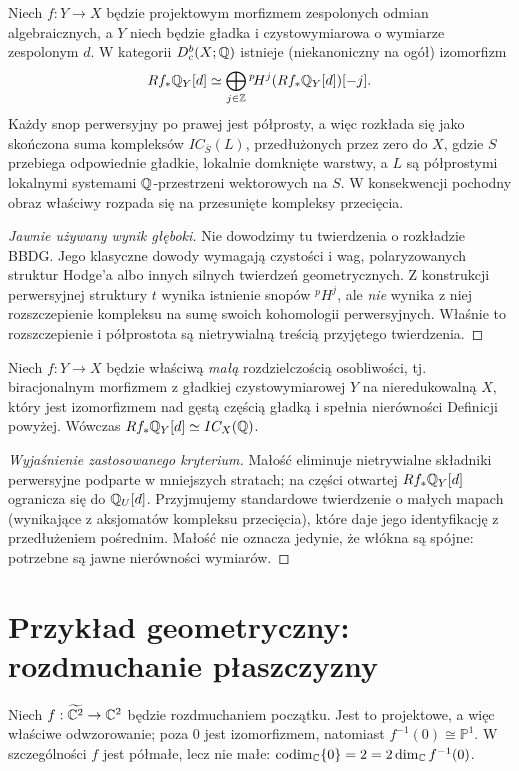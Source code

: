 \begin{twierdzenie}
\label{thm:decomposition-xiii}
Niech $f:Y\to X$ będzie projektowym morfizmem
zespolonych odmian algebraicznych, a $Y$
niech będzie gładka i czystowymiarowa o wymiarze
zespolonym $d$. W kategorii $D_c^b(X;\mathbb{Q})$ istnieje
(niekanoniczny na ogół) izomorfizm
\[
Rf_*\mathbb{Q}_Y[d]\simeq
\bigoplus_{j\in\mathbb{Z}}{}^p\!H^j(Rf_*\mathbb{Q}_Y[d])[-j].
\]
Każdy snop perwersyjny po prawej jest półprosty,
a więc rozkłada się jako skończona suma kompleksów
$IC_{\overline S}(L)$, przedłużonych przez zero
do $X$, gdzie $S$ przebiega odpowiednie gładkie,
lokalnie domknięte warstwy, a $L$ są
półprostymi lokalnymi systemami $\mathbb{Q}$-przestrzeni
wektorowych na $S$. W konsekwencji pochodny obraz
właściwy rozpada się na przesunięte kompleksy przecięcia.
\end{twierdzenie}
\begin{proof}[Jawnie używany wynik głęboki]
Nie dowodzimy tu twierdzenia o rozkładzie BBDG.
Jego klasyczne dowody wymagają czystości i wag,
polaryzowanych struktur Hodge'a albo innych
silnych twierdzeń geometrycznych.
Z konstrukcji perwersyjnej struktury $t$ wynika
istnienie snopów ${}^p\!H^j$, ale \emph{nie}
wynika z niej rozszczepienie kompleksu na sumę
swoich kohomologii perwersyjnych.
Właśnie to rozszczepienie i półprostota są
nietrywialną treścią przyjętego twierdzenia.
\end{proof}
\begin{wniosek}
\label{cor:small-map-ic-xiii}
Niech $f:Y\to X$ będzie właściwą \emph{małą}
rozdzielczością osobliwości, tj. biracjonalnym
morfizmem z gładkiej czystowymiarowej
$Y$ na nieredukowalną $X$, który jest izomorfizmem
nad gęstą częścią gładką i spełnia nierówności
Definicji powyżej. Wówczas
$Rf_*\mathbb{Q}_Y[d]\simeq IC_X(\mathbb{Q})$.
\end{wniosek}
\begin{proof}[Wyjaśnienie zastosowanego kryterium]
Małość eliminuje nietrywialne składniki
perwersyjne podparte w mniejszych stratach;
na części otwartej $Rf_*\mathbb{Q}_Y[d]$ ogranicza się
do $\mathbb{Q}_U[d]$. Przyjmujemy standardowe twierdzenie
o małych mapach (wynikające z aksjomatów
kompleksu przecięcia), które daje jego
identyfikację z przedłużeniem pośrednim.
Małość nie oznacza jedynie, że włókna są spójne:
potrzebne są jawne nierówności wymiarów.
\end{proof}

\section{Przykład geometryczny: rozdmuchanie płaszczyzny}
\label{sec:blowup-decomp-xiii}
Niech $f:\widetilde{\mathbb{C}^2}\to\mathbb{C}^2$ będzie
rozdmuchaniem początku. Jest to projektowe,
a więc właściwe odwzorowanie; poza $0$ jest
izomorfizmem, natomiast $f^{-1}(0)\cong\mathbb P^1$.
W szczególności $f$ jest półmałe, lecz nie małe:
$\operatorname{codim}_{\mathbb{C}}\{0\}=2=2\dim_{\mathbb{C}} f^{-1}(0)$.

